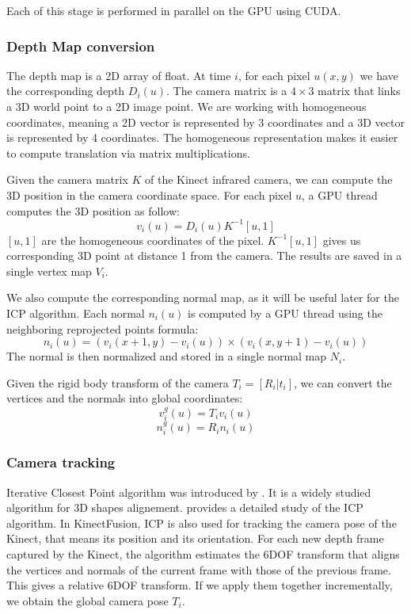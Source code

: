 \documentclass[12pt, twoside]{article}
\begin{document}
Each of this stage is performed in parallel on the GPU using CUDA.

\subsubsection{Depth Map conversion}
The depth map is a 2D array of float. At time $i$, for each pixel $u(x,y)$ we have the corresponding depth $D_i(u)$. The camera matrix is a $4\times 3$ matrix that links a 3D world point to a 2D image point. We are working with homogeneous coordinates, meaning a 2D vector is represented by 3 coordinates and a 3D vector is represented by 4 coordinates. The homogeneous representation makes it easier to compute translation via matrix multiplications.

Given the camera matrix $K$ of the Kinect infrared camera, we can compute the 3D position in the camera coordinate space. For each pixel $u$, a GPU thread computes the 3D position as follow:
$$v_i(u) = D_i(u)K^{-1}[u,1]$$
$[u,1]$ are the homogeneous coordinates of the pixel. $K^{-1}[u,1]$ gives us corresponding 3D point at distance 1 from the camera. The results are saved in a single vertex map $V_i$.

We also compute the corresponding normal map, as it will be useful later for the ICP algorithm. Each normal $n_i(u)$ is computed by a GPU thread using the neighboring reprojected points formula:
$$n_i(u) = (v_i(x+1,y) - v_i(u))\times (v_i(x,y+1) - v_i(u))$$
The normal is then normalized and stored in a single normal map $N_i$.

Given the rigid body transform of the camera $T_i = [R_i|t_i]$, we can convert the vertices and the normals into global coordinates:
$$v_i^g(u) = T_iv_i(u)$$
$$n_i^g(u) = R_in_i(u)$$

\subsubsection{Camera tracking}
Iterative Closest Point algorithm was introduced by \cite{ICP1}. It is a widely studied algorithm for 3D shapes alignement. \cite{ICP2} provides a detailed study of the ICP algorithm. In KinectFusion, ICP is also used for tracking the camera pose of the Kinect, that means its position and its orientation. For each new depth frame captured by the Kinect, the algorithm estimates the 6DOF transform that aligns the vertices and normals of the current frame with those of the previous frame. This gives a relative 6DOF transform. If we apply them together incrementally, we obtain the global camera pose $T_i$.
\end{document}
